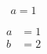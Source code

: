 \documentclass[varwidth]{standalone}
\begin{document}
\[
a = 1
\]

\begin{align*}
    a &= 1 \\
    b &= 2
\end{align*}
\end{document}
